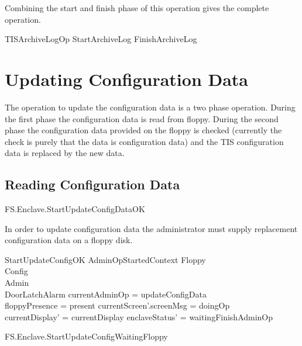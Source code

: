 Combining the start and finish phase of this operation gives the
complete operation.
\begin{zed}
        TISArchiveLogOp  StartArchiveLog \lor FinishArchiveLog
\end{zed}


\section{Updating Configuration Data}

The operation to update the configuration data is a two phase
operation. During the first phase the configuration data is read from
floppy. During the second phase the configuration data provided on the
floppy is checked (currently the check is purely that the data is
configuration data) and the TIS configuration data is replaced by the
new data.


\subsection{Reading Configuration Data}

\begin{traceunit}{FS.Enclave.StartUpdateConfigDataOK}
\end{traceunit}

In order to update configuration data the administrator must supply
replacement configuration data on a floppy disk.


\begin{schema}{StartUpdateConfigOK}
        AdminOpStartedContext
\also   
        \Xi Floppy
\\      \Xi Config
\\      \Xi Admin     
\\      \Xi DoorLatchAlarm
\where
       \The currentAdminOp = updateConfigData
\\      floppyPresence = present
\also
        currentScreen'.screenMsg = doingOp
\\      currentDisplay' = currentDisplay
\also
        enclaveStatus' = waitingFinishAdminOp
\end{schema}

\begin{traceunit}{FS.Enclave.StartUpdateConfigWaitingFloppy}
\end{traceunit}


